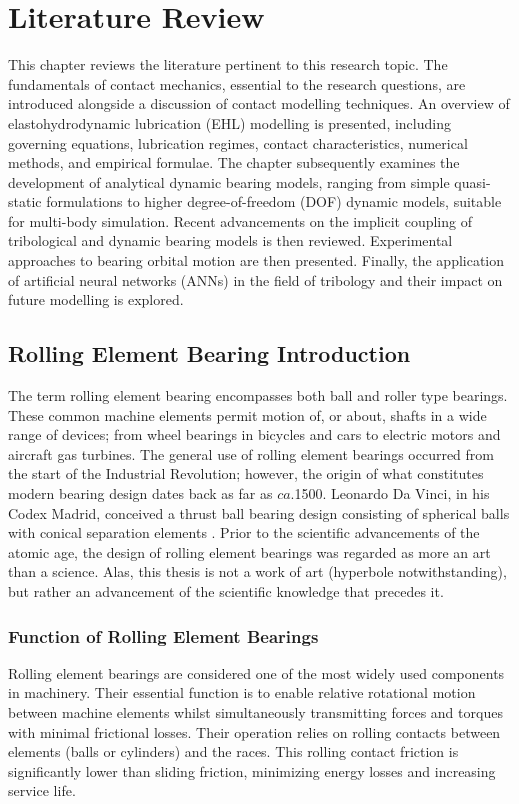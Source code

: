 \chapter{Literature Review}
\label{Literature Review}

This chapter reviews the literature pertinent to this research topic. The fundamentals of contact mechanics, essential to the research questions, are introduced alongside a discussion of contact modelling techniques. An overview of elastohydrodynamic lubrication (EHL) modelling is presented, including governing equations, lubrication regimes, contact characteristics, numerical methods, and empirical formulae. The chapter subsequently examines the development of analytical dynamic bearing models, ranging from simple quasi-static formulations to higher degree-of-freedom (DOF) dynamic models, suitable for multi-body simulation. Recent advancements on the implicit coupling of tribological and dynamic bearing models is then reviewed. Experimental approaches to bearing orbital motion are then presented. Finally, the application of artificial neural networks (ANNs) in the field of tribology and their impact on future modelling is explored.

\section{Rolling Element Bearing Introduction}

The term rolling element bearing encompasses both ball and roller type bearings. These common machine elements permit motion of, or about, shafts in a wide range of devices; from wheel bearings in bicycles and cars to electric motors and aircraft gas turbines. The general use of rolling element bearings occurred from the start of the Industrial Revolution; however, the origin of what constitutes modern bearing design dates back as far as $ca.$1500. Leonardo Da Vinci, in his Codex Madrid, conceived a thrust ball bearing design consisting of spherical balls with conical separation elements \cite{Harris2007}. Prior to the scientific advancements of the atomic age, the design of rolling element bearings was regarded as more an art than a science. Alas, this thesis is not a work of art (hyperbole notwithstanding), but rather an advancement of the scientific knowledge that precedes it.

\subsection{Function of Rolling Element Bearings}
Rolling element bearings are considered one of the most widely used components in machinery. Their essential function is to enable relative rotational motion between machine elements whilst simultaneously transmitting forces and torques with minimal frictional losses. Their operation relies on rolling contacts between elements (balls or cylinders) and the races. This rolling contact friction is significantly lower than sliding friction, minimizing energy losses and increasing service life.

